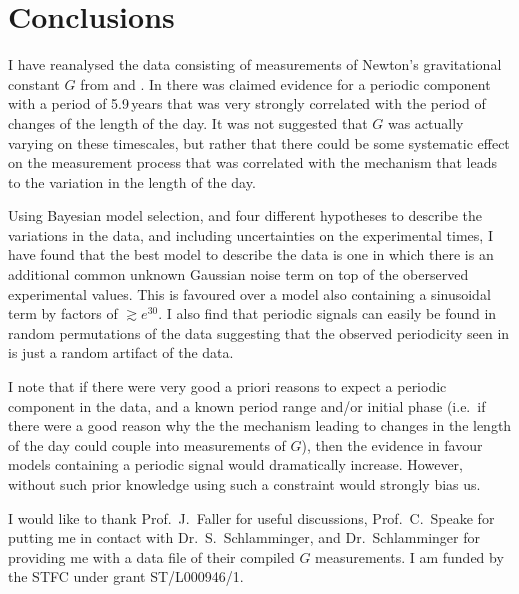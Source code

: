 \documentclass[comment]{epl2}
\begin{document}
\section{Conclusions}

I have reanalysed the data consisting of measurements of Newton's gravitational constant $G$ from
\cite{2015EL....11010002A} and \cite{2015arXiv150501774S}. In \cite{2015EL....11010002A} there was claimed
evidence for a periodic component with a period of 5.9\,years that was very strongly correlated with the
period of changes of the length of the day. It was not suggested that $G$ was actually varying on these
timescales, but rather that there could be some systematic effect on the measurement process that was
correlated with the mechanism that leads to the variation in the length of the day.

Using Bayesian model selection, and four different hypotheses to describe the variations in the data, and including
uncertainties on the experimental times, I have found that the best model to describe the data is one in which
there is an additional common unknown Gaussian noise term on top of the oberserved experimental values. This is 
favoured over a model also containing a sinusoidal term by factors of $\gtrsim e^{30}$. I also find that periodic
signals can easily be found in random permutations of the data suggesting that the observed periodicity seen in
\cite{2015EL....11010002A} is just a random artifact of the data.

I note that if there were very good a priori reasons to expect a periodic component in the data, and a known
period range and/or initial phase (i.e.\ if there were a good reason why the the mechanism leading to changes in the
length of the day could couple into measurements of $G$), then the evidence in favour models containing a periodic
signal would dramatically increase. However, without such prior knowledge using such a constraint would strongly bias
us.

\acknowledgements

I would like to thank Prof.\ J.\ Faller for useful discussions, Prof.\ C.\ Speake for putting me in contact with
Dr.\ S.\ Schlamminger, and Dr.\ Schlamminger for providing me with a data file of their compiled $G$ measurements.
I am funded by the STFC under grant ST/L000946/1.



\end{document}

